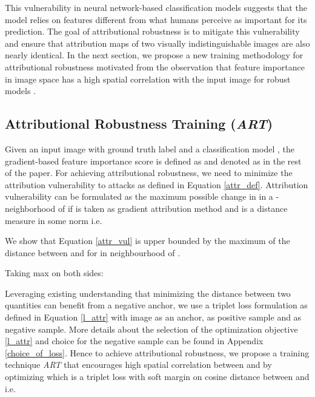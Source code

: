 \documentclass[runningheads]{llncs}
\begin{document}
This vulnerability in neural network-based classification models suggests that the model relies on features different from what humans perceive as important for its prediction. The goal of attributional robustness is to mitigate this vulnerability and ensure that attribution maps of two visually indistinguishable images are also nearly identical. In the next section, we propose a new training methodology for attributional robustness motivated from the observation that feature importance in image space has a high spatial correlation with the input image for robust models \cite{odds_madry,icml_theory_sal}. 


\subsection{Attributional Robustness Training (\textit{ART})}\label{art}
Given an input image  with ground truth label  and a classification model , the gradient-based feature importance score is defined as  and denoted as  in the rest of the paper. For achieving attributional robustness, we need to minimize the attribution vulnerability to attacks as defined in Equation \ref{attr_def}. Attribution vulnerability can be formulated as the maximum possible change in  in a -neighborhood of  if  is taken as gradient attribution method \cite{attr2013gradient} and  is a distance measure in some norm  i.e.


\noindent We show that Equation \ref{attr_vul} is upper bounded by the maximum of the distance between  and  for  in  neighbourhood of .

Taking max on both sides:


Leveraging existing understanding \cite{triplet1,triplet} that minimizing the distance between two quantities can benefit from a negative anchor, we use a triplet loss formulation as defined in Equation \ref{l_attr} with image  as an anchor,  as positive sample and  as negative sample. More details about the selection of the optimization objective \ref{l_attr} and choice for the negative sample can be found in Appendix \ref{choice_of_loss}. Hence to achieve attributional robustness, we propose a training technique \textit{ART} that encourages high spatial correlation between  and  by optimizing  which is a triplet loss \cite{triplet} with soft margin on cosine distance between  and  i.e.
\end{document}
